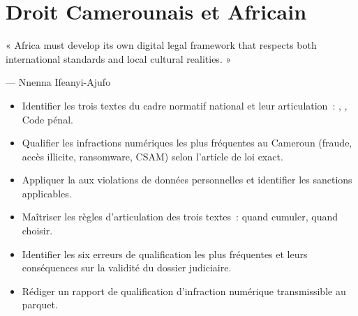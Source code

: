 
\chapter{Droit Camerounais et Africain}
\label{chap:droit-cam}

\epigraph{%
    « Africa must develop its own digital legal framework that respects
    both international standards and local cultural realities. »%
}{--- Nnenna Ifeanyi-Ajufo}


\begin{boxobjectifs}
\begin{itemize}
    \item Identifier les trois textes du cadre normatif national et
          leur articulation~: , ,
          Code pénal.
    \item Qualifier les infractions numériques les plus fréquentes
          au Cameroun (fraude, accès illicite, ransomware, CSAM) selon
          l'article de loi exact.
    \item Appliquer la  aux violations de données
          personnelles et identifier les sanctions applicables.
    \item Maîtriser les règles d'articulation des trois textes~:
          quand cumuler, quand choisir.
    \item Identifier les six erreurs de qualification les plus fréquentes
          et leurs conséquences sur la validité du dossier judiciaire.
    \item Rédiger un rapport de qualification d'infraction numérique
          transmissible au parquet.
\end{itemize}
\end{boxobjectifs}

